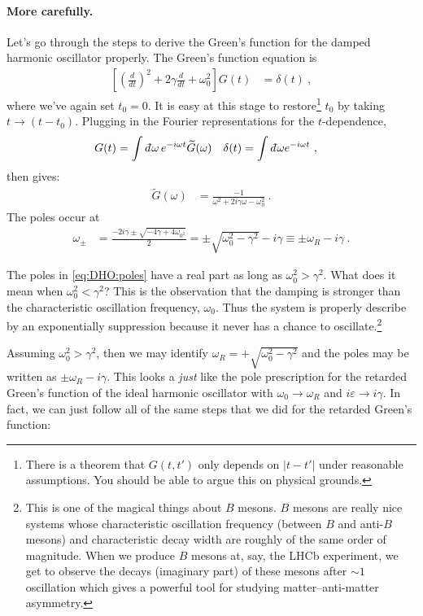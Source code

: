  \paragraph{More carefully.} Let's go through the steps to derive the Green's function for the damped harmonic oscillator properly. The Green's function equation is
 \begin{align}
 	\left[
 	\left(\frac{d}{dt}\right)^2
 	+ 2\gamma \frac{d}{dt}
 	+ \omega_0^2
 	\right]
 	G(t)
 	&=
 	\delta(t) \ ,
 \end{align}
 where we've again set $t_0 = 0$. It is easy at this stage to restore\footnote{There is a theorem that $G(t,t')$ only depends on $|t-t'|$ under reasonable assumptions. You should be able to argue this on physical grounds.} $t_0$ by taking $t\to (t-t_0)$. Plugging in the Fourier representations for the $t$-dependence,
 \begin{align}
 	G(t) &= \int \dbar \omega \, e^{-i\omega t}\tilde G(\omega)
 	&
 	\delta(t) &= \int \dbar \omega e^{-i\omega t} \ ,
 \end{align}
 then gives:
 \begin{align}
 	\tilde G(\omega) &=
 	\frac{-1}{\omega^2+2i\gamma\omega -\omega_0^2} \ .
 \end{align}
 The poles occur at 
 \begin{align}
 	\omega_\pm &= \frac{-2i\gamma \pm \sqrt{-4\gamma + 4\omega_{0^2}}}{2}
 	= \pm \sqrt{\omega_0^2 - \gamma^2} - i \gamma \equiv \pm \omega_R - i\gamma\ .
 	\label{eq:DHO:poles}
 \end{align}
 \begin{example}
 The poles in \eqref{eq:DHO:poles} have a real part as long as $\omega_0^2 > \gamma^2$. What does it mean when $\omega_0^2 < \gamma^2$? This is the observation that the damping is stronger than the characteristic oscillation frequency, $\omega_0$. Thus the system is properly describe by an exponentially suppression because it never has a chance to oscillate.\footnote{This is one of the magical things about $B$ mesons. $B$ mesons are really nice systems whose characteristic oscillation frequency (between $B$ and anti-$B$ mesons) and characteristic decay width are roughly of the same order of magnitude. When we produce $B$ mesons at, say, the LHCb experiment, we get to observe the decays (imaginary part) of these mesons after $\sim 1$ oscillation which gives a powerful tool for studying matter--anti-matter asymmetry.\label{footnote:B:meson}}
 \end{example}
 Assuming $\omega_0^2 > \gamma^2$, then we may identify $\omega_R = +\sqrt{\omega_0^2 - \gamma^2}$ and the poles may be written as $\pm \omega_R - i\gamma$. This looks a \emph{just} like the pole prescription for the retarded Green's function of the ideal harmonic oscillator with $\omega_0\to \omega_R$ and $i\varepsilon\to i\gamma$. In fact, we can just follow all of the same steps that we did for the retarded Green's function:
